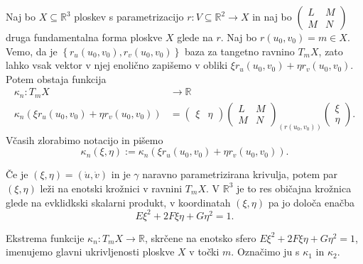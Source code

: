 \begin{definicija}
\label{def_razsiritev_normalne_ukrivljenosti}
    Naj bo $X \subseteq \mathbb{R}^3$ ploskev s parametrizacijo $r: V \subseteq \mathbb{R}^2 \to  X$
    in naj bo $\begin{pmatrix}
    L & M \\
    M & N
    \end{pmatrix}$ druga fundamentalna forma ploskve $X$ glede na $r$. Naj bo $r(u_0, v_0) = m \in  X$. Vemo, da je $\left\{ r_u(u_0, v_0), r_v(u_0, v_0) \right\}$ baza za
    tangetno ravnino $T_mX$, zato lahko vsak vektor v njej enolično zapišemo v obliki $\xi r_u(u_0, v_0) + \eta r_v(u_0, v_0).$
    Potem obstaja funkcija \begin{align*}
       \kappa_n : T_mX &\longrightarrow \mathbb{R} \\
        \kappa_n(\xi r_u(u_0, v_0) + \eta r_v(u_0, v_0)) &=
        \begin{pmatrix}
          \xi  & \eta
        \end{pmatrix}
        \begin{pmatrix}
          L & M \\
          M & N
        \end{pmatrix}_{(r(u_0, v_0))}  
        \begin{pmatrix}
          \xi \\
          \eta
        \end{pmatrix}.
    \end{align*} 
Včasih zlorabimo notacijo in pišemo \begin{equation*}
  \kappa_n(\xi, \eta) := \kappa_n(\xi r_u(u_0, v_0) + \eta r_v(u_0, v_0)).
\end{equation*}  
\end{definicija}

\begin{opomba}
 Če je $(\xi, \eta) = (\dot{u}, \dot{v})$ in je $\gamma$ naravno parametrizirana krivulja, potem par $(\xi, \eta)$ leži
 na enotski krožnici v ravnini $T_mX$. V $\mathbb{R}^3$ je to res običajna krožnica glede na
 evklidkski skalarni produkt, v koordinatah $(\xi, \eta)$ pa jo določa enačba 
 \begin{equation*} E \xi^2 + 2F \xi \eta + G \eta^2  = 1.\end{equation*}
\end{opomba}

\begin{definicija}
\label{def_glavni_ukrivljenosti_ploskve}
 Ekstrema funkcije $\kappa_n: T_mX \to  \mathbb{R}$, skrčene na enotsko sfero $E \xi^2 + 2F \xi \eta + G \eta^2  = 1$, imenujemo glavni ukrivljenosti ploskve $X$ v točki $m$. 
 Označimo ju s $\kappa_1$ in $\kappa_2$. 
\end{definicija}

